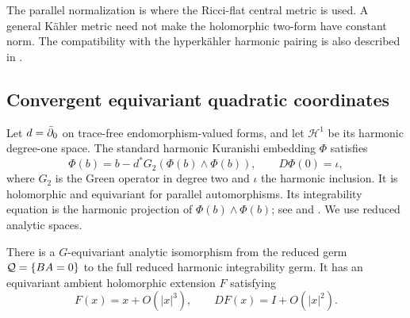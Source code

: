 The parallel normalization is where the Ricci-flat central metric is
used. A general K\"ahler metric need not make the holomorphic two-form
have constant norm. The compatibility with the hyperk\"ahler harmonic
pairing is also described in \cite[arXiv version, Proposition~9.1]{Ver96}.

\subsection{Convergent equivariant quadratic coordinates}

Let $d=\bar\partial_0$ on trace-free endomorphism-valued forms, and let
$\mathcal H^1$ be its harmonic degree-one space. The standard harmonic
Kuranishi embedding $\Phi$ satisfies
\begin{equation}\label{eq:harmonic-fixedpoint}
\Phi(b)=b-d^*G_2(\Phi(b)\wedge\Phi(b)),\qquad D\Phi(0)=\iota,
\end{equation}
where $G_2$ is the Green operator in degree two and $\iota$ the harmonic
inclusion. It is holomorphic and equivariant for parallel automorphisms.
Its integrability equation is the harmonic projection of
$\Phi(b)\wedge\Phi(b)$; see \cite[Theorem~1]{BS22} and
\cite[Proposition~4.3]{Del25}. We use reduced analytic spaces.

\begin{proposition}\label{prop:analytic-coordinates}
There is a $G$-equivariant analytic isomorphism from the reduced germ
$\mathcal Q=\{BA=0\}$ to the full reduced harmonic integrability germ.
It has an equivariant ambient holomorphic extension $F$ satisfying
\begin{equation}\label{eq:F-expansion}
F(x)=x+O(|x|^3),\qquad DF(x)=I+O(|x|^2).
\end{equation}
\end{proposition}

